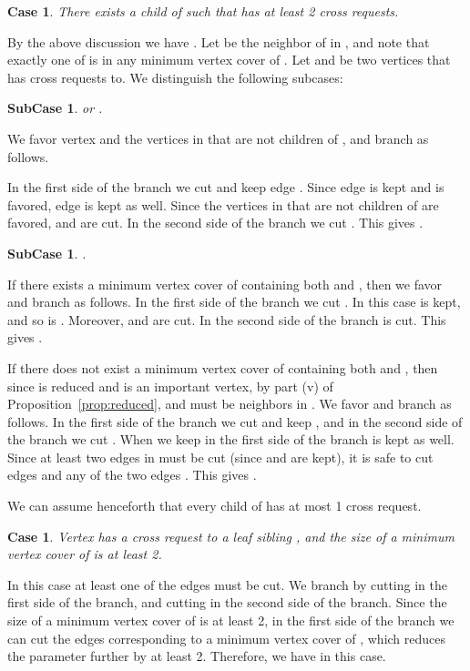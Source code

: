 \documentclass[11pt]{article}
\newtheorem{case}[theorem]{Case}
\newtheorem{subcase}[theorem]{SubCase}
\begin{document}
\begin{case}\label{case:3}
There exists a child  of  such that  has at least 2 cross requests.
\end{case}

By the above discussion we have . Let  be the neighbor of  in , and note that exactly one of  is in any minimum vertex cover of . Let  and  be two vertices that  has cross requests to. We distinguish the following subcases:

\begin{subcase}\label{subcase:31}
 or .
\end{subcase}


We favor vertex  and the vertices in  that are not children of , and branch as follows.

In the first side of the branch we cut  and keep edge . Since edge  is kept and  is favored, edge  is kept as well. Since the vertices in  that are not children of  are favored,  and  are cut. In the second side of the branch we cut . This gives .


\begin{subcase}\label{subcase:32}
.
\end{subcase}

If there exists a minimum vertex cover of  containing both  and , then we favor  and branch as follows. In the first side of the branch we cut . In this case  is kept, and so is . Moreover,  and  are cut. In the second side of the branch  is cut. This gives .

If there does not exist a minimum vertex cover of  containing both  and , then since  is reduced and  is an important vertex, by part (v) of Proposition~\ref{prop:reduced},  and  must be neighbors in . We favor  and branch as follows. In the first side of the branch we cut  and keep , and in the second side of the branch we cut . When we keep  in the first side of the branch  is kept as well. Since at least two edges in  must be cut (since  and  are kept), it is safe to cut edges  and any of the two edges . This gives .


We can assume henceforth that every child of  has at most 1 cross request.


\begin{case}\label{case:4}
Vertex  has a cross request to a leaf sibling , and the size of a minimum vertex cover of  is at least 2.
\end{case}

In this case at least one of the edges  must be cut. We branch by cutting  in the first side of the branch, and cutting  in the second side of the branch. Since the size of a minimum vertex cover of  is at least 2, in the first side of the branch we can cut the edges corresponding to a minimum vertex cover of , which reduces the parameter further by at least 2. Therefore, we have  in this case.
\end{document}

